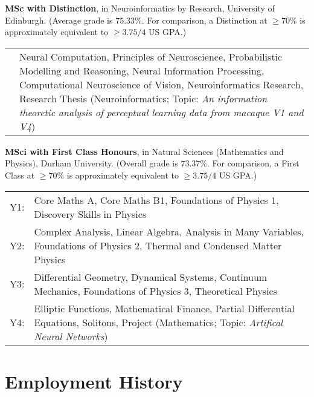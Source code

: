 \documentclass[11pt, a4paper]{article} %
\newcommand{\years}[1]{\marginnote{\scriptsize #1}} %
\renewenvironment{itemize}{
  \begin{list}{}{
    \setlength{\leftmargin}{0em}
  }
}{
  \end{list}
}
\begin{document}
\begin{itemize}
%
%
\item \years{2011--2012}\textbf{MSc with Distinction}, in Neuroinformatics by Research, University of Edinburgh. {\footnotesize(Average grade is $75.33\%$.
For comparison, a Distinction at $\ge70\%$ is approximately equivalent to $\ge3.75/4$ US GPA.)}\\
{\footnotesize
\begin{tabular}{lp{11.5cm}}
 &Neural Computation, Principles of Neuroscience, Probabilistic Modelling and Reasoning, Neural Information Processing, Computational Neuroscience of Vision, Neuroinformatics Research, Research Thesis (Neuroinformatics; Topic: \emph{An information theoretic analysis of perceptual learning data from macaque V1 and V4})\\
\end{tabular}
}
%
\item \years{2007--2011}\textbf{MSci with First Class Honours}, in Natural Sciences (Mathematics and Physics), Durham University. {\footnotesize(Overall grade is $73.37\%$.
For comparison, a First Class at $\ge70\%$ is approximately equivalent to $\ge3.75/4$ US GPA.)}\\
{\footnotesize
\begin{tabular}{lp{11.5cm}}
Y1:&Core Maths A, Core Maths B1, Foundations of Physics 1, Discovery Skills in Physics\\
Y2:&Complex Analysis, Linear Algebra, Analysis in Many Variables, Foundations of Physics 2, Thermal and Condensed Matter Physics\\
Y3:&Differential Geometry, Dynamical Systems, Continuum Mechanics, Foundations of Physics 3, Theoretical Physics\\
Y4:&Elliptic Functions, Mathematical Finance, Partial Differential Equations, Solitons, Project (Mathematics; Topic: \emph{Artifical Neural Networks})\\
\end{tabular}
}
%
\end{itemize}


\section*{Employment History}
\end{document}
